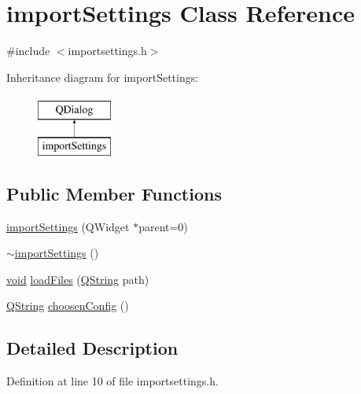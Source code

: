 \hypertarget{classimport_settings}{\section{import\-Settings Class Reference}
\label{classimport_settings}
}


{\ttfamily \#include $<$importsettings.\-h$>$}

Inheritance diagram for import\-Settings\-:\begin{figure}[H]
\begin{center}
\leavevmode
\includegraphics[height=2.000000cm]{classimport_settings}
\end{center}
\end{figure}
\subsection*{Public Member Functions}
\begin{DoxyCompactItemize}
\item 
\hyperlink{classimport_settings_acb2ef6bf76c3fc81b764a2cfac5b2582}{import\-Settings} (Q\-Widget $\ast$parent=0)
\item 
\hyperlink{classimport_settings_a48406c5f6bb7dfa94e120ea8f3bb72a6}{$\sim$import\-Settings} ()
\item 
\hyperlink{group___u_a_v_objects_plugin_ga444cf2ff3f0ecbe028adce838d373f5c}{void} \hyperlink{classimport_settings_a133358bf471790d7031c111bf5f0dfb1}{load\-Files} (\hyperlink{group___u_a_v_objects_plugin_gab9d252f49c333c94a72f97ce3105a32d}{Q\-String} path)
\item 
\hyperlink{group___u_a_v_objects_plugin_gab9d252f49c333c94a72f97ce3105a32d}{Q\-String} \hyperlink{classimport_settings_a16a67f71fc0787a882d94dd33b3ce38b}{choosen\-Config} ()
\end{DoxyCompactItemize}


\subsection{Detailed Description}


Definition at line 10 of file importsettings.\-h.



